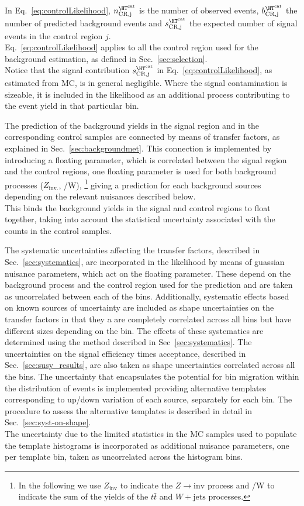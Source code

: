 In Eq.~\ref{eq:controlLikelihood}, $n^{\htcat}_{\mathrm{CR,j}}$ is the number of observed events, $b^{\htcat}_{\mathrm{CR,j}}$ the number of predicted 
background events and $s^{\htcat}_{\mathrm{CR,j}}$ the expected number of signal events in the control region $j$. \\
Eq.~\ref{eq:controlLikelihood} applies to all the control region used for the background estimation, 
as defined in Sec.~\ref{sec:selection}. \\
Notice that the signal contribution $s^{\htcat}_{\mathrm{CR,j}}$ in Eq.~\ref{eq:controlLikelihood}, as estimated from MC, is in general negligible. 
Where the signal contamination is sizeable, it is included in the likelihood as an additional process contributing to the event yield in that particular bin.

The prediction of the background yields in the signal region and in the corresponding control samples are connected 
by means of transfer factors, as explained in Sec.~\ref{sec:backgroundmet}. 
This connection is implemented by introducing a floating parameter, which is correlated 
between the signal region and the control regions, one floating parameter is used for both background 
processes ($Z_{\mathrm{inv.}}$, \ttbar/W), \footnote{In the following we use $Z_{\mathrm{inv}}$ to indicate 
the $Z\to \mathrm{inv}$ process and \ttbar/W to indicate the sum of the yields of the $t\bar{t}$ and $W+\mathrm{jets}$ processes.}
giving a prediction for each background sources depending on the relevant nuisances described below. \\
This binds the background yields in the signal and control regions to float together, 
taking into account the statistical uncertainty associated with the counts in the control samples. 

The systematic uncertainties affecting the transfer factors, described in Sec.~\ref{sec:systematics}, 
are incorporated in the likelihood by means of guassian nuisance parameters, which act on the floating
parameter. These depend on the background process and the control region used for the prediction and
are taken as uncorrelated between each of the \htcat bins. Additionally, systematic effects based on
known sources of uncertainty are included as shape uncertainties on the transfer factors in that they a
are completely correlated across all bins but have different sizes depending on the bin. The effects 
of these systematics are determined using the method described in Sec~\ref{sec:systematics}.
The uncertainties on the signal efficiency times acceptance, described in Sec.~\ref{sec:susy_results}, 
are also taken as shape uncertainties correlated across all the \htcat bins. 
The uncertainty that encapsulates the potential for bin migration within the \mht distribution of events is implemented 
providing alternative templates corresponding to up/down variation of each source, separately for each \htcat bin. 
The procedure to assess the alternative templates is described in detail in Sec.~\ref{sec:syst-on-shape}. \\
The uncertainty due to the limited statistics in the MC samples used to populate the template histograms is incorporated 
as additional nuisance parameters, one per template bin, taken as uncorrelated across the histogram bins. 


